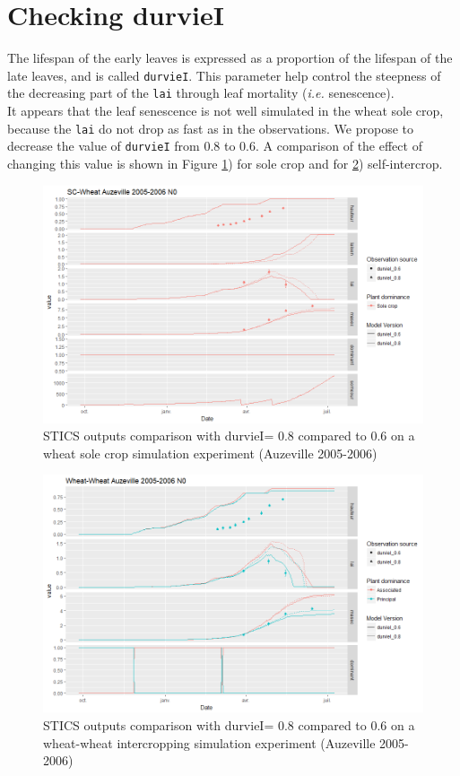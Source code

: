 \documentclass[
]{book}
\begin{document}
\hypertarget{checking-durviei}{%
\section{Checking durvieI}\label{checking-durviei}}

The lifespan of the early leaves is expressed as a proportion of the lifespan of the late leaves, and is called \texttt{durvieI}. This parameter help control the steepness of the decreasing part of the \texttt{lai} through leaf mortality (\emph{i.e.} senescence).\\
It appears that the leaf senescence is not well simulated in the wheat sole crop, because the \texttt{lai} do not drop as fast as in the observations. We propose to decrease the value of \texttt{durvieI} from 0.8 to 0.6. A comparison of the effect of changing this value is shown in Figure \ref{fig:durvieISC}) for sole crop and for \ref{fig:durvieIIC}) self-intercrop.

\begin{figure}
\centering
\includegraphics{img/durvieISC.png}
\caption{\label{fig:durvieISC}STICS outputs comparison with durvieI= 0.8 compared to 0.6 on a wheat sole crop simulation experiment (Auzeville 2005-2006)}
\end{figure}

\begin{figure}
\centering
\includegraphics{img/durvieIIC.png}
\caption{\label{fig:durvieIIC}STICS outputs comparison with durvieI= 0.8 compared to 0.6 on a wheat-wheat intercropping simulation experiment (Auzeville 2005-2006)}
\end{figure}
\end{document}
